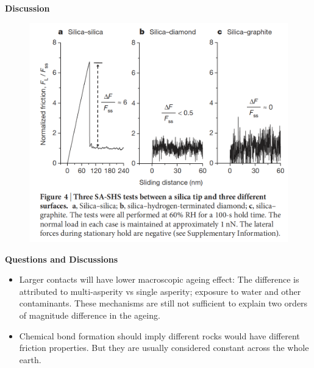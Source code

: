 \documentclass[11pt]{beamer}
\begin{document}
\begin{frame}{\textbf{Discussion}}
    \begin{figure}
        \includegraphics[width=0.6\linewidth]{images/4}
    \end{figure}
\end{frame}

\begin{frame}{\textbf{Questions and Discussions}}
    \begin{itemize}
        \item Larger contacts will have lower macroscopic ageing effect: The difference is attributed to multi-asperity vs single asperity; exposure to water and other contaminants. These mechanisms are still not sufficient to explain two orders of magnitude difference in the ageing. 
        \item Chemical bond formation should imply different rocks would have different friction properties. But they are usually considered constant across the whole earth.
    \end{itemize}
\end{frame}
\end{document}
